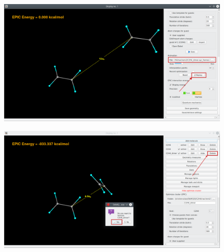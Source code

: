 \documentclass[a4paper,10pt]{article}
\begin{document}
\begin{minipage}{.5\linewidth}
\begin{figure}[H]
\caption{\label{fig:55}}
\begin{center}
\includegraphics[width=0.95\linewidth]{damqt_QS_fig55_b.png}
\end{center}
\end{figure} 
\end{minipage}
\begin{minipage}{.5\linewidth}
\begin{figure}[H]
\caption{\label{fig:56}}
\begin{center}
\includegraphics[width=0.95\linewidth]{damqt_QS_fig56_b.png}
\end{center}
\end{figure} 
\end{minipage}
\end{document}
